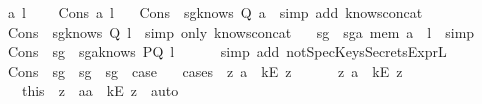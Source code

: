 \begin{isabellebody}
\isamarkupfalse \isanewline
\ \ \isamarkupfalse \ a\ l\ \isanewline
\ \ \isamarkupfalse \ {\isacharparenleft}Cons\ a\ l{\isacharparenright}\isanewline
\ \ \isamarkupfalse \ Cons\ \isamarkupfalse \ sg{}{\isacharcolon}{\isachardoublequoteopen}knows\ Q\ {\isacharbrackleft}a{\isacharbrackright}{\isachardoublequoteclose}\ \isamarkupfalse \ {\isacharparenleft}simp\ add{\isacharcolon}\ knows{\isacharunderscore}concat{\isacharunderscore}{}{\isacharparenright}\isanewline
\ \ \isamarkupfalse \ Cons\ \isamarkupfalse \ sg{}{\isacharcolon}{\isachardoublequoteopen}knows\ Q\ l{\isachardoublequoteclose}\ \isamarkupfalse \ {\isacharparenleft}simp\ only{\isacharcolon}\ knows{\isacharunderscore}concat{\isacharunderscore}{}{\isacharparenright}\isanewline
\ \ \isamarkupfalse \ sg{}\ \isamarkupfalse \ sg{}{\isacharcolon}{\isachardoublequoteopen}a\ mem\ {\isacharparenleft}a\ {\isacharhash}\ l{\isacharparenright}{\isachardoublequoteclose}\ \isamarkupfalse \ simp\isanewline
\ \ \isamarkupfalse \ Cons\ \ sg{}\ \isamarkupfalse \ sg{}a{\isacharcolon}{\isachardoublequoteopen}knows\ PQ\ l{\isachardoublequoteclose}\ \isanewline
\ \ \ \ \isamarkupfalse \ {\isacharparenleft}simp\ add{\isacharcolon}\ notSpecKeysSecretsExpr{\isacharunderscore}L{}{\isacharparenright}\isanewline
\ \ \isamarkupfalse \ Cons\ \ sg{}\ \ sg{}\ \ sg{}\ \isamarkupfalse \ {\isacharquery}case\isanewline
\ \ \isamarkupfalse \ {\isacharparenleft}cases\ {\isachardoublequoteopen}{\isasymexists}\ z{}{\isachardot}\ a\ {\isacharequal}\ kE\ z{}{\isachardoublequoteclose}{\isacharparenright}\isanewline
\ \ \ \ \isamarkupfalse \ {\isachardoublequoteopen}{\isasymexists}\ z{}{\isachardot}\ a\ {\isacharequal}\ {\isacharparenleft}kE\ z{}{\isacharparenright}{\isachardoublequoteclose}\isanewline
\ \ \ \ \isamarkupfalse \ this\ \isamarkupfalse \ z\ \ a{}{\isacharcolon}{\isachardoublequoteopen}a\ {\isacharequal}\ {\isacharparenleft}kE\ z{\isacharparenright}{\isachardoublequoteclose}\ \isamarkupfalse \ auto\isanewline

\end{isabellebody}

